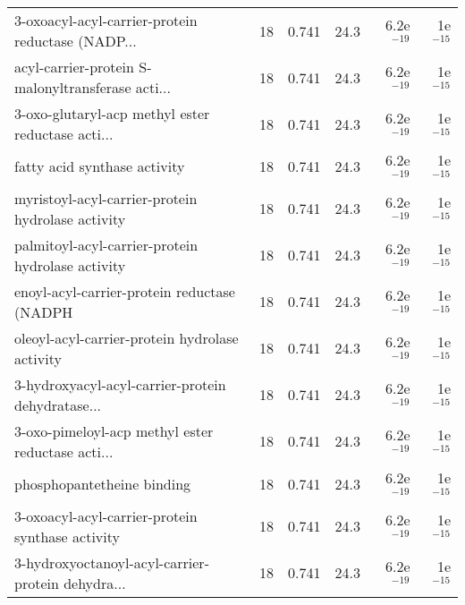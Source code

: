 \begin{longtable}{lrrrrr}
 3-oxoacyl-acyl-carrier-protein reductase (NADP... &                      18 &                   0.741 &       24.3 &         6.2e$^{-19}$ &           1e$^{-15}$ \\
 acyl-carrier-protein S-malonyltransferase acti... &                      18 &                   0.741 &       24.3 &         6.2e$^{-19}$ &           1e$^{-15}$ \\
 3-oxo-glutaryl-acp methyl ester reductase acti... &                      18 &                   0.741 &       24.3 &         6.2e$^{-19}$ &           1e$^{-15}$ \\
                      fatty acid synthase activity &                      18 &                   0.741 &       24.3 &         6.2e$^{-19}$ &           1e$^{-15}$ \\
 myristoyl-acyl-carrier-protein hydrolase activity &                      18 &                   0.741 &       24.3 &         6.2e$^{-19}$ &           1e$^{-15}$ \\
 palmitoyl-acyl-carrier-protein hydrolase activity &                      18 &                   0.741 &       24.3 &         6.2e$^{-19}$ &           1e$^{-15}$ \\
       enoyl-acyl-carrier-protein reductase (NADPH &                      18 &                   0.741 &       24.3 &         6.2e$^{-19}$ &           1e$^{-15}$ \\
    oleoyl-acyl-carrier-protein hydrolase activity &                      18 &                   0.741 &       24.3 &         6.2e$^{-19}$ &           1e$^{-15}$ \\
 3-hydroxyacyl-acyl-carrier-protein dehydratase... &                      18 &                   0.741 &       24.3 &         6.2e$^{-19}$ &           1e$^{-15}$ \\
 3-oxo-pimeloyl-acp methyl ester reductase acti... &                      18 &                   0.741 &       24.3 &         6.2e$^{-19}$ &           1e$^{-15}$ \\
                        phosphopantetheine binding &                      18 &                   0.741 &       24.3 &         6.2e$^{-19}$ &           1e$^{-15}$ \\
  3-oxoacyl-acyl-carrier-protein synthase activity &                      18 &                   0.741 &       24.3 &         6.2e$^{-19}$ &           1e$^{-15}$ \\
 3-hydroxyoctanoyl-acyl-carrier-protein dehydra... &                      18 &                   0.741 &       24.3 &         6.2e$^{-19}$ &           1e$^{-15}$ \\

\end{longtable}
